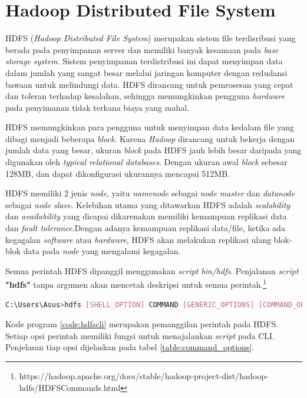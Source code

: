 \section{Hadoop Distributed File System}
\label{sec:hdfs}
HDFS (\textit{Hadoop Distributed File System}) merupakan sistem file terdisribusi yang berada pada penyimpanan server dan memiliki banyak kesamaan pada \textit{base storage system}. Sistem penyimpanan terdistribusi ini dapat menyimpan data dalam jumlah yang sangat besar melalui jaringan komputer dengan redudansi bawaan untuk melindungi data. HDFS dirancang untuk pemrosesan yang cepat dan toleran terhadap kesalahan, sehingga memungkinkan pengguna \textit{hardware} pada penyimanan tidak terkana biaya yang mahal.

HDFS memungkinkan para pengguna untuk menyimpan data kedalam file yang dibagi menjadi beberapa \textit{block}. Karena \textit{Hadoop} dirancang untuk bekerja dengan jumlah data yang besar, ukuran \textit{block} pada HDFS jauh lebih besar daripada yang digunakan oleh \textit{typical relational databases}. Dengan ukuran awal \textit{block} sebesar 128MB, dan dapat dikonfigurasi ukurannya mencapai 512MB.\cite{sam:16:hadoop}

HDFS memiliki 2 jenis \textit{node}, yaitu \textit{namenode} sebagai \textit{node master} dan \textit{datanode} sebagai \textit{node slave}. Kelebihan utama yang ditawarkan HDFS adalah \textit{scalability} dan \textit{availability} yang dicapai dikarenakan memiliki kemampuan replikasi data dan \textit{fault tolerance}.Dengan adanya kemampuan replikasi data/file, ketika ada kegagalan \textit{software }atau \textit{hardware}, HDFS akan melakukan replikasi ulang blok-blok data pada \textit{node} yang mengalami kegagalan.\cite{alex:14:hadoop}

Semua perintah HDFS dipanggil menggunakan \textit{script} \textit{bin/hdfs}. Penjalanan \textit{script} \textbf{"hdfs"} tanpa argumen akan mencetak deskripsi untuk semua perintah.\footnote{https://hadoop.apache.org/docs/stable/hadoop-project-dist/hadoop-hdfs/HDFSCommands.html}
\begin{lstlisting}[language=Bash, caption=Perintah HDFS CLI,label={code:hdfscli}]
	C:\Users\Asus>hdfs [SHELL_OPTION] COMMAND [GENERIC_OPTIONS] [COMMAND_OPTIONS]
\end{lstlisting}
Kode program \ref{code:hdfscli} merupakan pemanggilan perintah pada HDFS. Setiap opsi perintah memiliki fungsi untuk menajalankan \textit{script} pada CLI. Penjelasan tiap opsi dijelaskan pada tabel \ref{table:command_options}.  

